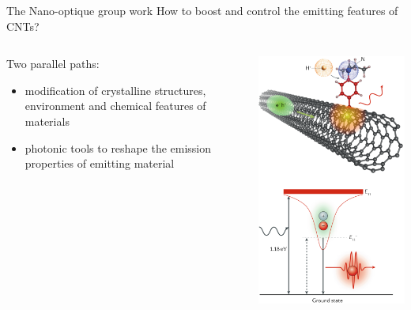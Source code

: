 \documentclass[xcolor = {dvipsnames}]{beamer}
\begin{document}
\begin{frame}{The Nano-optique group work}
How to boost and control the emitting features of CNTs?\\
\begin{columns}
\begin{column}{0.6\textwidth}
Two parallel paths:
  \begin{itemize}
	\item <1-> modification of crystalline structures, environment and chemical features of materials
	\item <2-> photonic tools to reshape the emission properties of emitting material
  \end{itemize}
  \end{column}
  \begin{column}{0.4\textwidth}
  \centering
  \includegraphics[width=.7\textwidth]{images/color}
  \end{column}
  \end{columns}
\end{frame}
\end{document}
